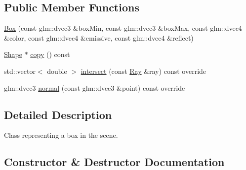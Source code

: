 \subsection*{Public Member Functions}
\begin{DoxyCompactItemize}
\item 
\hyperlink{class_box_abfd946b41f47834eaa541b722bac9a29}{Box} (const glm\+::dvec3 \&box\+Min, const glm\+::dvec3 \&box\+Max, const glm\+::dvec4 \&color, const glm\+::dvec4 \&emissive, const glm\+::dvec4 \&reflect)
\item 
\hyperlink{class_shape}{Shape} $\ast$ \hyperlink{class_box_a4770c219ac36060feee72d02c45dab04}{copy} () const 
\item 
std\+::vector$<$ double $>$ \hyperlink{class_box_a32bbf5e25c16d002f2ff858177c25cd8}{intersect} (const \hyperlink{class_ray}{Ray} \&ray) const override
\item 
glm\+::dvec3 \hyperlink{class_box_a13821ada4849a78e238ced9260904a15}{normal} (const glm\+::dvec3 \&point) const override
\end{DoxyCompactItemize}


\subsection{Detailed Description}
Class representing a box in the scene. 

\subsection{Constructor \& Destructor Documentation}
